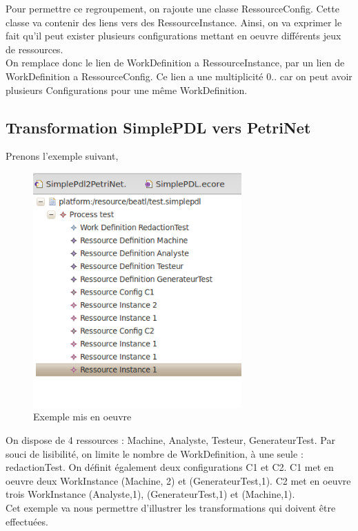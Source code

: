 Pour permettre ce regroupement, on rajoute une classe RessourceConfig. Cette classe va contenir des liens vers des RessourceInstance. Ainsi, on va exprimer le fait qu'il peut exister plusieurs configurations mettant en oeuvre différents jeux de ressources.\\

On remplace donc le lien de WorkDefinition a RessourceInstance, par un lien de WorkDefinition a RessourceConfig. Ce lien a une multiplicité 0..\* car on peut avoir plusieurs Configurations pour une même WorkDefinition.

\subsection{Transformation SimplePDL vers PetriNet}

Prenons l'exemple suivant, 

\begin{figure}[!h] 
\begin{center}
\includegraphics[width=8cm]{Capture-15.png}
\caption{Exemple mis en oeuvre} 
\label{img1} 
\end{center}
\end{figure}

On dispose de 4 ressources : Machine, Analyste, Testeur, GenerateurTest.
Par souci de lisibilité, on limite le nombre de WorkDefinition, à une seule : redactionTest. On définit également deux configurations C1 et C2. C1 met en oeuvre deux WorkInstance (Machine, 2) et (GenerateurTest,1). C2 met en oeuvre trois WorkInstance (Analyste,1), (GenerateurTest,1) et (Machine,1).\\

Cet exemple va nous permettre d'illustrer les transformations qui doivent être effectuées.\\

